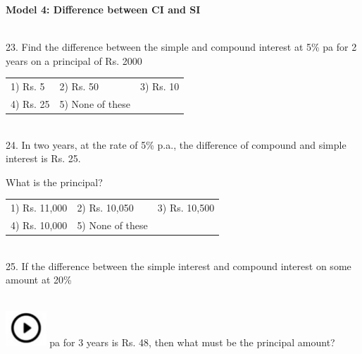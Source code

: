 \documentclass{article}
\begin{document}
	\noindent 
	
	\noindent \textbf{Model 4: Difference between CI and SI}
	
	\noindent 
	
	\noindent 
	
	\noindent  \\ 23. Find the difference between the simple and compound interest at 5\% pa for 2 years on a principal of Rs. 2000
	
	\noindent \begin{tabular}{p{1.7in} p{1.6in} p{1.6in}} \\ 
 1) Rs. 5                       &  2) Rs. 50              &  3) Rs. 10              \\
4) Rs. 25              & 5) None of these  \\
\end{tabular}
	
	\noindent 
	
	\noindent 
	
	\noindent 
	
	\noindent \\  24. In two years, at the rate of 5\% p.a., the difference of compound and simple interest is Rs. 25.
	
	\noindent 
	
	\noindent What is the principal?
	
	\noindent 
	
	\noindent \begin{tabular}{p{1.7in} p{1.6in} p{1.6in}} \\ 
 1) Rs. 11,000              &  2) Rs. 10,050       &  3) Rs. 10,500       \\
4) Rs. 10,000       & 5) None of these  \\
\end{tabular}
	
	\noindent 
	
	\noindent 
	
	\noindent 
	
	\noindent  \\ 25. If the difference between the simple interest and compound interest on some amount at 20\%
	
	\noindent  
\noindent \\ \includegraphics*[width=0.60in, height=0.52in]{images/image1} pa for 3 years is Rs. 48, then what must be the principal amount?
	
\end{document}
